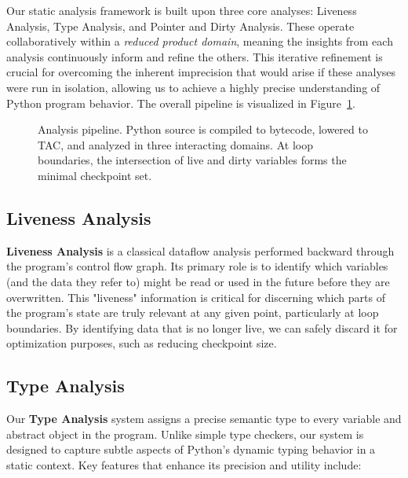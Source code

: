 Our static analysis framework is built upon three core analyses: Liveness Analysis, Type Analysis, and Pointer and Dirty Analysis. These operate collaboratively within a \emph{reduced product domain}, meaning the insights from each analysis continuously inform and refine the others. This iterative refinement is crucial for overcoming the inherent imprecision that would arise if these analyses were run in isolation, allowing us to achieve a highly precise understanding of Python program behavior. The overall pipeline is visualized in Figure~\ref{fig:overview}.

\begin{figure}[t]
    \centering
    
    \caption{Analysis pipeline. Python source is compiled to bytecode, lowered to TAC, and analyzed in three interacting domains. At loop boundaries, the intersection of live and dirty variables forms the minimal checkpoint set.}
    \label{fig:overview}
\end{figure}

\subsection{Liveness Analysis}

\textbf{Liveness Analysis} is a classical dataflow analysis performed backward through the program's control flow graph. Its primary role is to identify which variables (and the data they refer to) might be read or used in the future before they are overwritten. This "liveness" information is critical for discerning which parts of the program's state are truly relevant at any given point, particularly at loop boundaries. By identifying data that is no longer live, we can safely discard it for optimization purposes, such as reducing checkpoint size.

\subsection{Type Analysis}

Our \textbf{Type Analysis} system assigns a precise semantic type to every variable and abstract object in the program. Unlike simple type checkers, our system is designed to capture subtle aspects of Python's dynamic typing behavior in a static context. Key features that enhance its precision and utility include:

